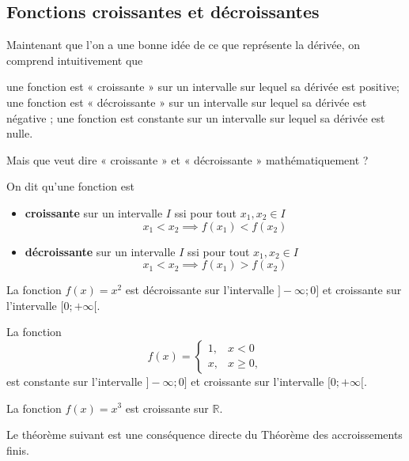 \documentclass[a4paper,12pt]{article}
\begin{document}
\subsection{Fonctions croissantes et décroissantes}
Maintenant que l'on a une bonne idée de ce que représente la dérivée, on comprend intuitivement que 
\begin{tasks}
\task une fonction est « croissante » sur un intervalle sur lequel sa dérivée est positive;
\task une fonction est « décroissante » sur un intervalle sur lequel sa dérivée est négative ;
\task une fonction est constante sur un intervalle sur lequel sa dérivée est nulle.
\end{tasks}
Mais que veut dire « croissante » et « décroissante » mathématiquement ?
\begin{definition}
	\tcblower
	On dit qu'une fonction est
	\begin{itemize}
		\item {\bfseries croissante} sur un intervalle $I$ ssi pour tout $x_1, x_2\in I$
			\[x_1<x_2\implies f(x_1)<f(x_2)\]

		\item {\bfseries décroissante} sur un intervalle $I$ ssi pour tout $x_1, x_2\in I$
			\[x_1<x_2\implies f(x_1)>f(x_2)\]
	\end{itemize}
\end{definition}
\begin{exemple}
	\tcblower
La fonction $f(x)=x^2$ est décroissante sur l'intervalle $]-\infty;0]$ et croissante sur l'intervalle $[0;+\infty[$. 
\end{exemple}
\begin{exemple}
	\tcblower
	La fonction \[f(x)=\begin{cases}
		1,&x<0\\
		x,&x\geq 0,
	\end{cases}\]
	est constante sur l'intervalle $]-\infty;0]$ et croissante sur l'intervalle $[0;+\infty[$. 
\end{exemple}
\begin{exemple}
	\tcblower
	La fonction $f(x)=x^3$ est croissante sur $\mathbb{R}$.	
\end{exemple}

Le théorème suivant est une conséquence directe du Théorème des accroissements finis.
\end{document}
